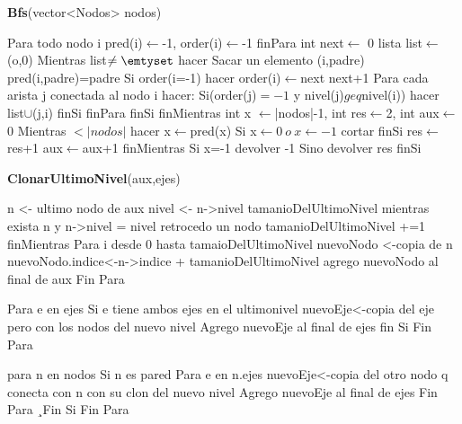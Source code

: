 \documentclass[spanish,12pt]{article}
\begin{document}
\begin{algorithm}[H]{\textbf{Bfs}(vector<Nodos> nodos)}
	\begin{algorithmic}[1]
		\State \quad Para todo nodo i
			\State \quad \quad  pred(i)$\gets$-1, order(i)$\gets$-1
		\State \quad finPara
		\State \quad int next$\gets$ 0
		\State \quad lista list$\gets${(o,0)}
		\State \quad Mientras list$\neq \emtyset$ hacer
			\State \quad \quad Sacar un elemento (i,padre)
			\State \quad \quad pred(i,padre)=padre
			\State \quad \quad Si order(i=-1) hacer
				\State \quad \quad \quad order(i)$\gets$next
				\State \quad \quad \quad next+1
				\State \quad \quad \quad Para cada arista j conectada al nodo i hacer:
					\State \quad \quad \quad \quad Si(order(j)$=-1$ y nivel(j)$geq$nivel(i)) hacer
						 \State \quad \quad \quad \quad \quad list$\cup${(j,i)}
					\State \quad \quad \quad \quad finSi
				\State \quad \quad \quad   finPara
			\State \quad \quad  finSi
		\State \quad finMientras
		\State \quad int x $\gets$|nodos|-1, int res$\gets$2, int aux$\gets$0
		\State \quad Mientras $< |nodos|$ hacer
			\State \quad \quad  x$\gets$pred(x)
			\State \quad \quad Si x$\gets0 \ o \ x\gets-1$ cortar finSi
			\State \quad \quad res$\gets$res+1
			\State \quad \quad aux$\gets$aux+1
		\State \quad finMientras
		\State \quad Si x=-1
			\State \quad \quad devolver -1
		\State \quad Sino
			\State \quad \quad  devolver res
		\State \quad finSi




	\end{algorithmic}
\end{algorithm}

\begin{algorithm}[H]{\textbf{ClonarUltimoNivel}(aux,ejes)}
	\begin{algorithmic}[1]
		\State n <- ultimo nodo  de aux
		\State nivel <- n->nivel
		\State tamanioDelUltimoNivel
		\State mientras exista n  y n->nivel = nivel
			\State retrocedo un nodo
			\State tamanioDelUltimoNivel +=1
		\State finMientras
		\State Para i desde 0 hasta tamaioDelUltimoNivel
		  \State nuevoNodo <-copia de n
			\State nuevoNodo.indice<-n->indice + tamanioDelUltimoNivel
			\State agrego nuevoNodo al final de  aux
		\State Fin Para

		\State Para e en ejes
		 \State Si e tiene ambos ejes en el ultimonivel
		 	\State nuevoEje<-copia del eje pero con los nodos del nuevo nivel
		  \State Agrego nuevoEje al final de ejes
		 \State fin Si
		 \State Fin Para

		\State para n en nodos
		  \State Si n es pared
				\State Para e en n.ejes
				\State nuevoEje<-copia del otro nodo q conecta con n con su clon del nuevo nivel
				\State Agrego nuevoEje al final de ejes
				\State Fin Para
			\State¸Fin Si
		\State Fin Para
	\end{algorithmic}
\end{algorithm}
\end{document}

